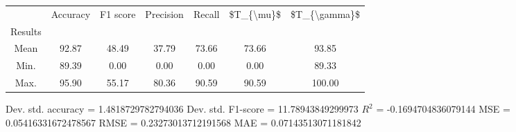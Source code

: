 \begin{tabular}{|c|c|c|c|c|c|c|}
\toprule
{} &  Accuracy &  F1 score &  Precision &  Recall &  \$T\_\{\textbackslash mu\}\$ &  \$T\_\{\textbackslash gamma\}\$ \\
Results &           &           &            &         &            &               \\
\hline
Mean    &     92.87 &     48.49 &      37.79 &   73.66 &      73.66 &         93.85 \\
Min.    &     89.39 &      0.00 &       0.00 &    0.00 &       0.00 &         89.33 \\
Max.    &     95.90 &     55.17 &      80.36 &   90.59 &      90.59 &        100.00 \\
\bottomrule
\end{tabular}

 Dev. std. accuracy = 1.4818729782794036
 Dev. std. F1-score = 11.78943849299973
 $R^2$ = -0.1694704836079144
 MSE = 0.05416331672478567
 RMSE = 0.23273013712191568
 MAE = 0.07143513071181842